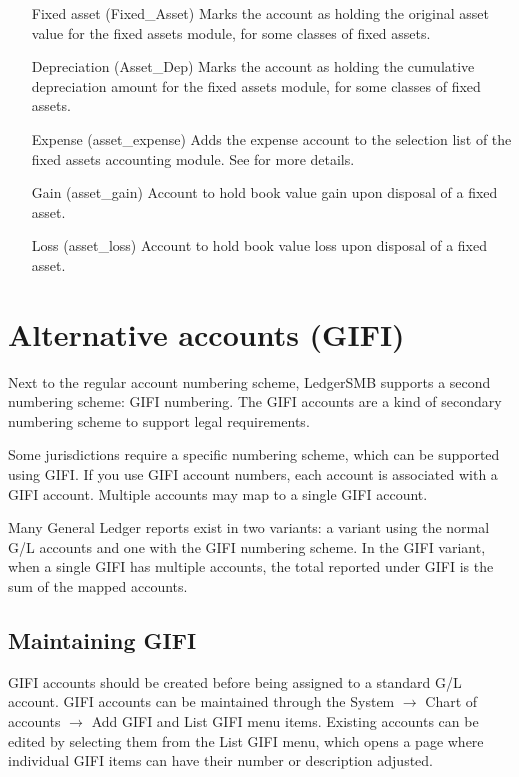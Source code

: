 \begin{enumerate}
\item[Fixed asset (Fixed\_Asset)] Marks the account as holding the original asset value for the fixed
   assets module, for some classes of fixed assets.
\item[Depreciation (Asset\_Dep)] Marks the account as holding the cumulative depreciation amount
   for the fixed assets module, for some classes of fixed assets.
\item[Expense (asset\_expense)] Adds the expense account to the selection list of the fixed assets
   accounting module. See  for more details.
\item[Gain (asset\_gain)] Account to hold book value gain upon disposal of a fixed asset.
\item[Loss (asset\_loss)] Account to hold book value loss upon disposal of a fixed asset.
\end{enumerate}


\section{Alternative accounts (GIFI)}

Next to the regular account numbering scheme, LedgerSMB supports a second numbering scheme: GIFI numbering. The GIFI accounts are a kind of secondary numbering scheme to support legal requirements.

Some jurisdictions require a specific numbering scheme, which can be supported using GIFI. If you
use GIFI account numbers, each account is associated with a GIFI account. Multiple accounts may map
to a single GIFI account.

Many General Ledger reports exist in two variants: a variant using the normal G/L accounts and
one with the GIFI numbering scheme. In the GIFI variant, when a single GIFI has multiple accounts,
the total reported under GIFI is the sum of the mapped accounts.


\subsection{Maintaining GIFI}

GIFI accounts should be created before being assigned to a standard G/L account. GIFI accounts
can be maintained through the System $\rightarrow$ Chart of accounts $\rightarrow$ Add GIFI and List GIFI menu items. Existing accounts can be edited by selecting them from the List GIFI menu, which opens a page where individual GIFI items can have their number or
description adjusted.


